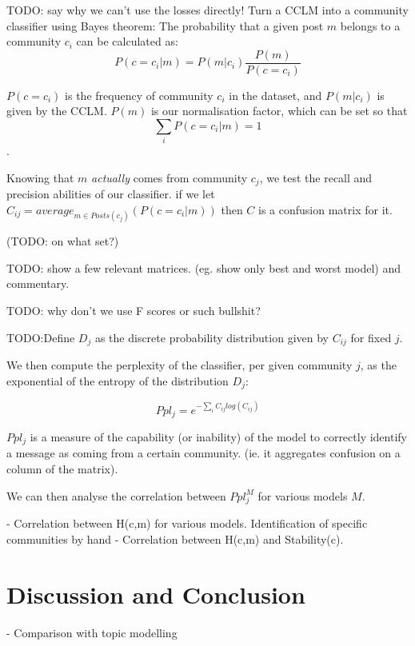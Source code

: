 \documentclass[11pt,a4paper]{article}
\begin{document}
TODO: say why we can't use the losses directly!
Turn a CCLM into a community classifier using Bayes theorem: The
probability that a given post $m$ belongs to a community $c_i$ can be
calculated as:
\[P(c=c_i | m) = P(m | c_i)\frac {P(m)} {P(c=c_i)}\]

$P(c=c_i)$ is the frequency of community $c_i$ in the dataset, and
$P(m | c_i)$ is given by the CCLM. $P(m)$ is our normalisation factor, which can be set so that
\[\sum_i P(c=c_i | m) = 1\].

Knowing that $m$ \emph{actually} comes from community $c_j$, we test
the recall and precision abilities of our classifier.  if we let
$C_{ij} = average_{m ∈ Posts(c_j)}(P(c=c_i | m))$ then $C$ is a
confusion matrix for it.

(TODO: on what set?)

TODO: show a few relevant matrices. (eg. show only best and worst model) and commentary.

TODO: why don't we use F scores or such bullshit?

TODO:Define \(D_j\) as the discrete probability distribution given by \(C_{ij}\) for fixed \(j\).

We then compute the perplexity of the classifier, per given community
$j$, as the exponential of the entropy of the distribution \(D_j\):

\[Ppl_j = e^{-\sum_i C_{ij} log(C_{ij})}\]


\(Ppl_j\) is a measure of the capability (or inability) of the model
to correctly identify a message as coming from a certain
community. (ie. it aggregates confusion on a column of the matrix).

We can then analyse the correlation between \(Ppl^M_j\) for various models $M$.


- Correlation between H(c,m) for various models. Identification of specific communities by hand
- Correlation between H(c,m) and Stability(c).

\section{Discussion and Conclusion}

- Comparison with topic modelling
\end{document}
